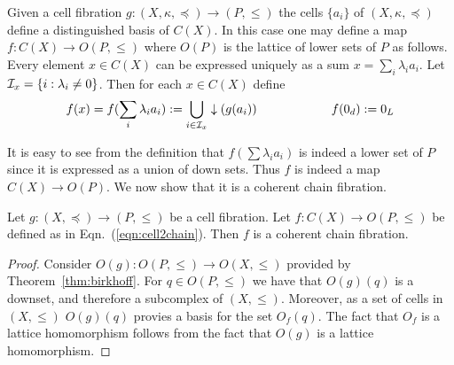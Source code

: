 Given a cell fibration $g:(X,\kappa, \preceq)\to (P,\leq)$ the cells $\{a_i\}$ of $(X,\kappa,\preceq)$ define a distinguished basis of $C(X)$.  In this case one may define a map $f:C(X)\to O(P,\leq)$ where $O(P)$ is the lattice of lower sets of $P$ as follows.  Every element $x\in C(X)$ can be expressed uniquely as a sum $x=\sum_i \lambda_i a_i$.  Let ${\mathcal I}_x = \{i: \lambda_i\neq 0\}$.  Then for each $x\in C(X)$ define
\begin{align} \label{eqn:cell2chain}
f(x) = f(\sum_i \lambda_i a_i):= \bigcup_{i\in {\mathcal I}_x} \downarrow (g(a_i))\quad\quad\quad\quad\quad\quad
f(0_d):= 0_L
\end{align}

It is easy to see from the definition that $f(\sum \lambda_i a_i)$ is indeed a lower set of $P$ since it is expressed as a union of down sets.  Thus $f$ is indeed a map $C(X)\to O(P)$.  We now show that it is a coherent chain fibration.

\begin{prop}
Let $g:(X,\preceq)\to (P,\leq)$ be a cell fibration.  Let $f:C(X)\to O(P,\leq)$ be defined as in Eqn.~(\ref{eqn:cell2chain}).  Then $f$ is a coherent chain fibration.
\end{prop}
\begin{proof}
Consider $O(g):O(P,\leq)\to O(X,\leq)$ provided by Theorem~\ref{thm:birkhoff}. For $q\in O(P,\leq)$ we have that $O(g)(q)$ is a downset, and therefore a subcomplex of $(X,\leq)$.  Moreover, as a set of cells in $(X,\leq)$ $O(g)(q)$ provies a basis for the set $O_f(q)$.  The fact that $O_f$ is a lattice homomorphism follows from the fact that $O(g)$ is a lattice homomorphism.

\end{proof}

